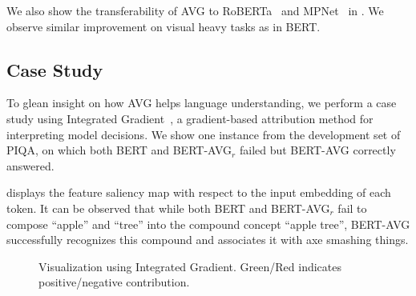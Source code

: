We also show the transferability of AVG to RoBERTa~\citep{DBLP:journals/corr/abs-1907-11692} and MPNet~\citep{mpnet} in . We observe similar improvement on visual heavy tasks as in BERT.

\subsection{Case Study}
To glean insight on how AVG helps language understanding, we perform a case study using Integrated Gradient~\citep{ig}, a gradient-based attribution method for interpreting model decisions. We show one instance from the development set of PIQA, on which both BERT and BERT-AVG$_r$ failed but BERT-AVG correctly answered.

 displays the feature saliency map with respect to the input embedding of each token. It can be observed that while both BERT and BERT-AVG$_r$ fail to compose ``apple'' and ``tree'' into the compound concept ``apple tree'', BERT-AVG successfully recognizes this 
compound and associates it with axe smashing things.
\begin{figure}[t]
	\centering
	\caption{Visualization using Integrated Gradient. Green/Red indicates positive/negative contribution.} \label{fig:IG}
\end{figure} 
